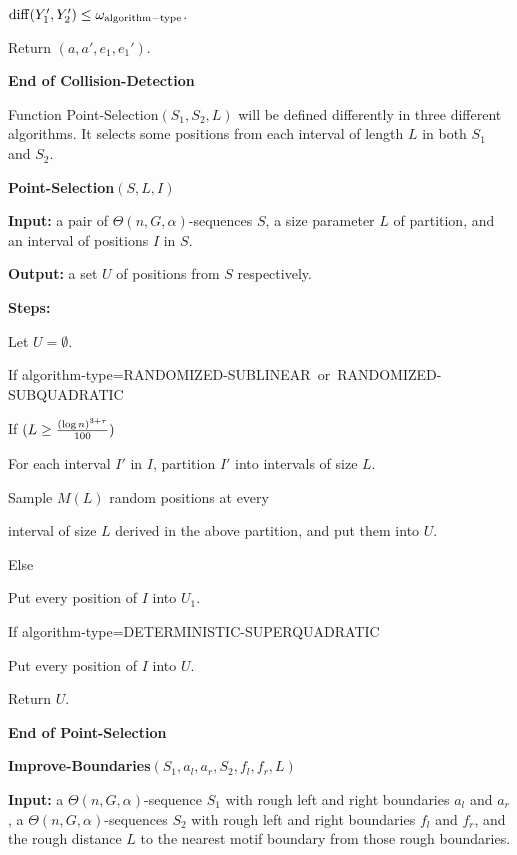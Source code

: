 \documentclass[11pt]{article}
\newcommand{\diff}{{\rm diff}}
\newcommand{\thresholdL}{{(\log n)^{3+\tau}\over 100}}
\newcommand{\algtype}{{\rm algorithm-type}}
\newcommand{\sublinear}{{\rm RANDOMIZED-SUBLINEAR}}
\newcommand{\randomized}{{\rm RANDOMIZED-SUBQUADRATIC}}
\newcommand{\deterministic}{{\rm DETERMINISTIC-SUPERQUADRATIC}}
\begin{document}
\qquad $\diff(Y_1',Y_2')\le \omega_{\algtype}$.


\qquad Return $(a,a',e_1,e_1')$.

{\bf End of Collision-Detection}

Function Point-Selection$(S_1,S_2,L)$ will be defined differently in
three different algorithms. It selects some positions from each
interval of length $L$ in both $S_1$ and $S_2$.




\vskip 10pt {\bf Point-Selection$(S,L, I)$}

{\bf Input:} a pair of $\Theta(n,G,\alpha)$-sequences $S$,  a size
parameter $L$ of partition, and an interval of positions $I$ in $S$.

{\bf Output:} a set $U$ of positions from $S$ respectively.


 {\bf Steps:}

Let $U=\emptyset$.


If \algtype=\sublinear~or~\randomized

\qquad If $(L\ge \thresholdL)$


\qquad\qquad For each interval $I'$ in $I$, partition $I'$  into
intervals of size $L$.

\qquad\qquad  Sample $M(L)$ random positions at every

\qquad\qquad\qquad\qquad interval of size $L$ derived in the above
partition, and put them into $U$.

\qquad Else

\qquad\qquad Put every position  of $I$ into $U_1$.

If \algtype=\deterministic

\qquad\qquad Put every position  of $I$ into $U$.

Return $U$.



{\bf End of Point-Selection}













\vskip 10pt {\bf Improve-Boundaries$(S_1,a_l, a_r, S_2, f_l,
f_r,L)$}

{\bf Input:} a $\Theta(n,G,\alpha)$-sequence $S_1$ with rough left
and right boundaries $a_l$ and $a_r$, a
$\Theta(n,G,\alpha)$-sequences $S_2$ with rough left and right
boundaries $f_l$ and $f_r$, and the rough distance $L$ to the
nearest motif boundary from those rough boundaries.
\end{document}
